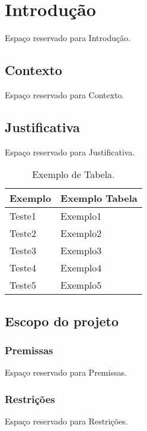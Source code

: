 \chapter[Introdução]{Introdução}

Espaço reservado para Introdução.

\section{Contexto}
 
Espaço reservado para Contexto.

\section{Justificativa}

Espaço reservado para Justificativa.

\begin{table}[h!]
\centering
\begin{tabular}{|l|l|}
\hline
\textbf{Exemplo} & \textbf{Exemplo Tabela} \\ \hline
Teste1        & Exemplo1                         \\ \hline
Teste2         & Exemplo2                     \\ \hline
Teste3         & Exemplo3                        \\ \hline
Teste4            & Exemplo4                  \\ \hline
Teste5       & Exemplo5                   \\ \hline
\end{tabular}
\caption{Exemplo de Tabela.}\label{isquemia_orgaos}
\end{table}

\section{Escopo do projeto}
 \subsection{Premissas}
  
  Espaço reservado para Premissas.

  \subsection{Restrições}
  
  Espaço reservado para Restrições.

